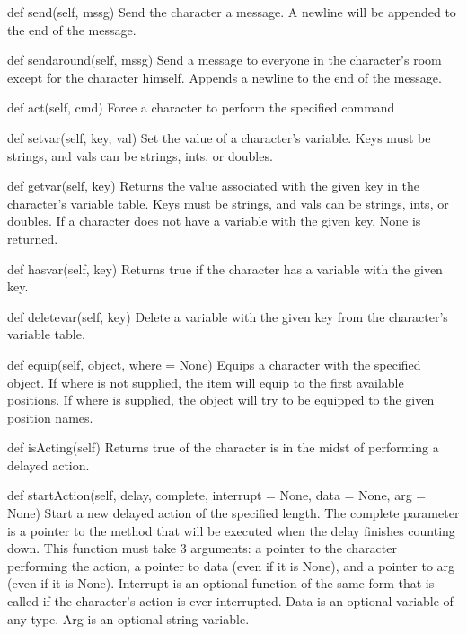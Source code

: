 \documentclass[12pt]{article}
\begin{document}
def send(self, mssg) \newline
Send the character a message. A newline will be appended to the end of the message.

def sendaround(self, mssg) \newline
Send a message to everyone in the character's room except for the character himself. Appends a newline to the end of the message.

def act(self, cmd) \newline
Force a character to perform the specified command

def setvar(self, key, val) \newline
Set the value of a character's variable. Keys must be strings, and vals can be strings, ints, or doubles.

def getvar(self, key) \newline
Returns the value associated with the given key in the character's variable table. Keys must be strings, and vals can be strings, ints, or doubles. If a character does not have a variable with the given key, None is returned.

def hasvar(self, key) \newline
Returns true if the character has a variable with the given key.

def deletevar(self, key) \newline
Delete a variable with the given key from the character's variable table.

def equip(self, object, where = None) \newline
Equips a character with the specified object. If where is not supplied, the item will equip to the first available positions. If where is supplied, the object will try to be equipped to the given position names.

def isActing(self) \newline
Returns true of the character is in the midst of performing a delayed action.

def startAction(self, delay, complete, interrupt = None, data = None, arg = None) \newline
Start a new delayed action of the specified length. The complete parameter is a pointer to the method that will be executed when the delay finishes counting down. This function must take 3 arguments: a pointer to the character performing the action, a pointer to data (even if it is None), and a pointer to arg (even if it is None). Interrupt is an optional function of the same form that is called if the character's action is ever interrupted. Data is an optional variable of any type. Arg is an optional string variable.
\end{document}
